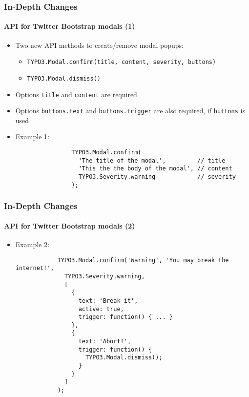 \begin{frame}[fragile]
	\frametitle{In-Depth Changes}
	\framesubtitle{API for Twitter Bootstrap modals (1)}

	\lstset{basicstyle=\smaller\ttfamily}

	\begin{itemize}

		\item Two new API methods to create/remove modal popups:
			\begin{itemize}
				\item \texttt{TYPO3.Modal.confirm(title, content, severity, buttons)}
				\item \texttt{TYPO3.Modal.dismiss()}
			\end{itemize}

		\item Options \texttt{title} and \texttt{content} are required
		\item Options \texttt{buttons.text} and \texttt{buttons.trigger} are also required, if \texttt{buttons} is used

		\item Example 1:

			\begin{lstlisting}
				TYPO3.Modal.confirm(
				  'The title of the modal',         // title
				  'This the the body of the modal', // content
				  TYPO3.Severity.warning            // severity
				);
			\end{lstlisting}

	\end{itemize}

\end{frame}


\begin{frame}[fragile]
	\frametitle{In-Depth Changes}
	\framesubtitle{API for Twitter Bootstrap modals (2)}

	\begin{itemize}

		\item Example 2:

		\begin{lstlisting}
			TYPO3.Modal.confirm('Warning', 'You may break the internet!',
			  TYPO3.Severity.warning,
			  [
			    {
			      text: 'Break it',
			      active: true,
			      trigger: function() { ... }
			    },
			    {
			      text: 'Abort!',
			      trigger: function() {
			        TYPO3.Modal.dismiss();
			      }
			    }
			  ]
			);
		\end{lstlisting}

	\end{itemize}

\end{frame}

